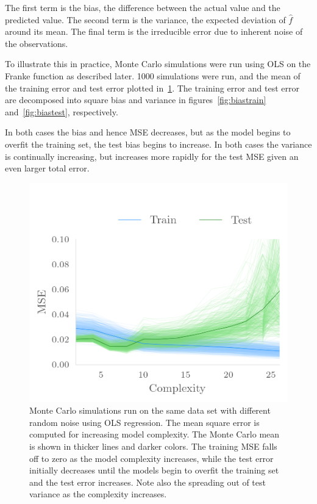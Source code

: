 The first term is the bias, the difference between the actual value and the
predicted value. The second term is the variance, the expected deviation of
\(\hat f\) around its mean. The final term is the irreducible error due to
inherent noise of the observations.

To illustrate this in practice, Monte Carlo simulations were run using OLS on
the Franke function as described later. 1000 simulations were run, and the mean
of the training error and test error plotted in~\cref{fig:bias}. The training
error and test error are decomposed into square bias and variance in figures~\ref{fig:biastrain}
and~\ref{fig:biastest}, respectively.

In both cases the bias and hence MSE decreases, but as the model begins to
overfit the training set, the test bias begins to increase. In both cases the
variance is continually increasing, but increases more rapidly for the test MSE
given an even larger total error.

\begin{figure}[]
  \centering
  \includegraphics[]{figures/testrainmse.png}
  \caption{\label{fig:bias} Monte Carlo simulations run on the same data set
    with different random noise using OLS regression. The mean square error is
    computed for increasing model complexity. The Monte Carlo mean is shown in
    thicker lines and darker colors. The training MSE falls off
  to zero as the model complexity increases, while the test error initially
  decreases until the models begin to overfit the training set and the test
  error increases. Note also the spreading out of test variance as the complexity
  increases.} 
\end{figure}


